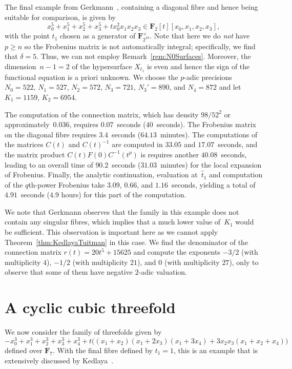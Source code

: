 The final example from Gerkmann~\citep[\S 7.6]{Gerkmann2007}, 
containing a diagonal fibre and hence being suitable for comparison, 
is given by 
\begin{equation*}
x_0^5 + x_1^5 + x_2^5 + x_3^5 + t x_0^2 x_1 x_2 x_3 \in \mathbf{F}_2[t][x_0,x_1,x_2,x_3],
\end{equation*}
with the point $t_1$ chosen as a generator of $\mathbf{F}_{2^{10}}^{\times}$. 
Note that here we do \emph{not} have $p \geq n$ so the Frobenius matrix is not 
automatically integral;  specifically, we find that $\delta = 5$.  Thus, 
we can not employ Remark~\ref{rem:N0Surfaces}.  Moreover, the 
dimension~$n-1 = 2$ of the hypersurface $X_{t_1}$ is even and hence 
the sign of the functional equation is a priori unknown.
We choose the $p$-adic precisions $N_0 = 522$, $N_1 = 527$, $N_2 = 572$, 
$N_3 = 721$, $N_3' = 890$, and $N_4 = 872$ and let $K_1 = 1159$, $K_2 = 6954$.

The computation of the connection matrix, which has density $98 / 52^2$ 
or approximately~$0.036$, requires $0.07$~seconds ($40$~seconds).  
The Frobenius matrix on the diagonal fibre requires $3.4$~seconds 
($64.13$~minutes).  The computations of the matrices $C(t)$ and $C(t)^{-1}$ 
are computed in $33.05$ and $17.07$~seconds, and the matrix product 
$C(t) F(0) C^{-1}(t^p)$ is requires another $40.08$~seconds, leading 
to an overall time of $90.2$~seconds ($31.03$~minutes) for the local 
expansion of Frobenius.  Finally, the analytic continuation, evaluation 
at~$\hat{t}_1$ and computation of the $q$th-power Frobenius take $3.09$, 
$0.66$, and $1.16$~seconds, yielding a total of $4.91$~seconds ($4.9$ hours) 
for this part of the computation.

We note that Gerkmann observes that the family in this example does 
not contain any singular fibres, which implies that a much lower value 
of~$K_1$ would be sufficient.  This observation is important here as we 
cannot apply Theorem~\ref{thm:KedlayaTuitman} in this case.  
We find the denominator of the connection matrix $r(t) = 20 t^5+15625$ 
and compute the exponents $-3/2$ (with multiplicity $4$), 
$-1/2$ (with multiplicity $21$), and $0$ (with multiplicity $27$), 
only to observe that some of them have negative $2$-adic valuation.

\section{A cyclic cubic threefold}

We now consider the family of threefolds given by 
\begin{equation*}
-x_0^3 + x_1^3 + x_2^3 + x_3^3 + x_4^3 
+ t\bigl((x_1+x_2)(x_1+2x_3)(x_1+3x_4) + 3 x_2 x_3 (x_1 + x_2 + x_4)\bigr) 
\end{equation*}
defined over $\mathbf{F}_{7}$.  With the final fibre defined by $t_1 = 1$, 
this is an example that is extensively discussed by 
Kedlaya~\citep[Example~1.6.1]{Kedlaya2011}.  

